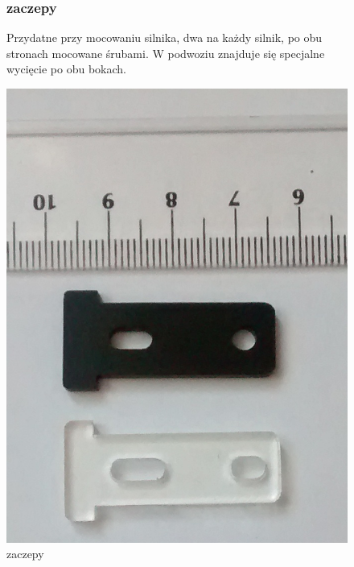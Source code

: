 \documentclass[a4paper,11pt]{article}
\def\SCALE{0.6}
\begin{document}
\begin{figure}[H]
	\subsubsection{zaczepy}
	Przydatne przy mocowaniu silnika, dwa na każdy silnik, po obu stronach mocowane śrubami. W 			podwoziu znajduje się specjalne wycięcie po obu bokach.

	\centering
	\includegraphics[width=\SCALE
	\paperwidth]{trzymacze}
	\caption{zaczepy}


\end{figure}
\end{document}
